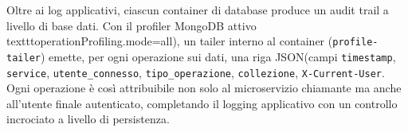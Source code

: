 Oltre ai log applicativi, ciascun container di database produce un audit trail a livello di base dati. Con il profiler MongoDB attivo texttt{operationProfiling.mode=all}), un tailer interno al container (\texttt{profile-tailer}) emette, per ogni operazione sui dati, una riga JSON(campi \texttt{timestamp}, \texttt{service}, \texttt{utente\_connesso}, \texttt{tipo\_operazione}, \texttt{collezione}, \texttt{X-Current-User}. Ogni operazione è così attribuibile non solo al microservizio chiamante ma anche all'utente finale autenticato, completando il logging applicativo con un controllo incrociato a livello di persistenza.

